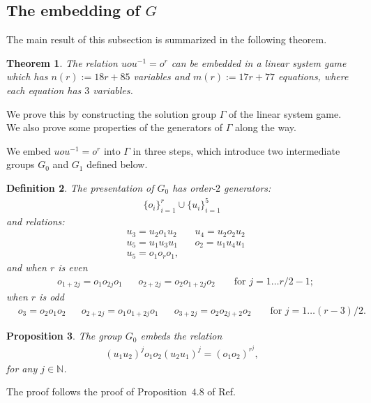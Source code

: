 \documentclass[11pt,letterpaper]{article}
\newcommand{\N}{\mathbb{N}}
\newcommand{\1}{\mathbb{1}}
\newtheorem{theorem}{Theorem}[section]
\newtheorem{proposition}[theorem]{Proposition}
\newtheorem{definition}[theorem]{Definition}
\theoremstyle{definition}
\begin{document}
\subsection{The embedding of $G$}
The main result of this subsection is summarized in the following theorem.
\begin{theorem}
	The relation $uou^{-1} = o^r$ can be embedded in a linear system game which has
	$n(r) := 18r+85$ variables and $m(r) := 17r + 77$ equations, where each equation has $3$ variables.
\end{theorem}
We prove this by constructing the solution group $\Gamma$ of the linear system game. 
We also prove some properties of the generators of $\Gamma$ along the way.

We embed $uou^{-1}= o^r$ into $\Gamma$ in three steps, which introduce two intermediate groups $G_0$ and $G_1$ defined below.
\begin{definition}	
\label{def:g0}
	The presentation of $G_0$ has order-$2$ generators:
	\begin{align*}
		\{o_i\}_{i=1}^{r} \cup \{u_i\}_{i=1}^5
	\end{align*}
	and relations:
	\begin{align*}
	&u_3 = u_2o_1u_2 && u_4 = u_2o_2u_2 \\
	&u_5 = u_1u_3u_1 && o_2 = u_1u_4u_1\\
	&u_5 = o_1 o_r o_1,
	\end{align*}
	and when $r$ is even
	\begin{align*}
	&o_{1+2j} = o_1o_{2j}o_1 && o_{2+2j} = o_2o_{1+2j}o_2&& \text{ for } j = 1 \dots r/2 - 1;
	\end{align*}
	when $r$ is odd
	\begin{align*}
	&o_3 = o_2o_1o_2 &&
	 o_{2+2j} =o_1o_{1+2j}o_1 && o_{3+2j} = o_2o_{2j+2}o_2 &&\text{ for } j = 1 \dots (r-3)/2.
	\end{align*}
\end{definition}
\begin{proposition}
	The group $G_0$ embeds the relation 
	\begin{align}
		(u_1u_2)^j o_1o_2 (u_2u_1)^j = (o_1o_2)^{r^j}, 
	\end{align}
	for any $ j \in \N$.
\end{proposition}
The proof follows the proof of Proposition~$4.8$ of Ref.~\cite{slofstra2017}
\end{document}

